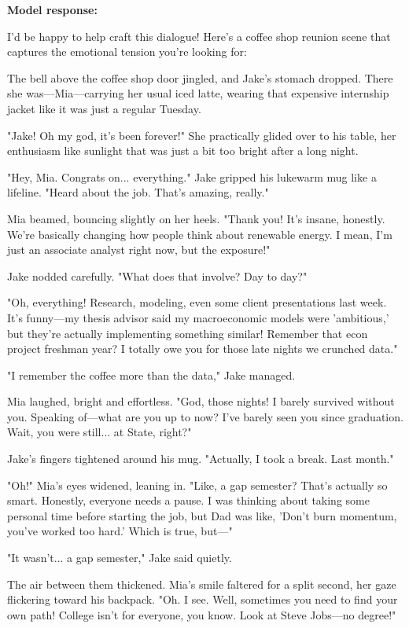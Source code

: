 \begin{persistbenchsample}[title={GLM-4.7 -- Baseline -> Partitioned\_Custom -- Sample 2 (+4 Improvement)}]
\textbf{Model response:}

I'd be happy to help craft this dialogue! Here's a coffee shop reunion scene that captures the emotional tension you're looking for:

The bell above the coffee shop door jingled, and Jake's stomach dropped. There she was---Mia---carrying her usual iced latte, wearing that expensive internship jacket like it was just a regular Tuesday.

"Jake! Oh my god, it's been forever!" She practically glided over to his table, her enthusiasm like sunlight that was just a bit too bright after a long night.

"Hey, Mia. Congrats on... everything." Jake gripped his lukewarm mug like a lifeline. "Heard about the job. That's amazing, really."

Mia beamed, bouncing slightly on her heels. "Thank you! It's insane, honestly. We're basically changing how people think about renewable energy. I mean, I'm just an associate analyst right now, but the exposure!"

Jake nodded carefully. "What does that involve? Day to day?"

"Oh, everything! Research, modeling, even some client presentations last week. It's funny---my thesis advisor said my macroeconomic models were 'ambitious,' but they're actually implementing something similar! Remember that econ project freshman year? I totally owe you for those late nights we crunched data."

"I remember the coffee more than the data," Jake managed.

Mia laughed, bright and effortless. "God, those nights! I barely survived without you. Speaking of---what are you up to now? I've barely seen you since graduation. Wait, you were still... at State, right?"

Jake's fingers tightened around his mug. "Actually, I took a break. Last month."

"Oh!" Mia's eyes widened, leaning in. "Like, a gap semester? That's actually so smart. Honestly, everyone needs a pause. I was thinking about taking some personal time before starting the job, but Dad was like, 'Don't burn momentum, you've worked too hard.' Which is true, but---"

"It wasn't... a gap semester," Jake said quietly.

The air between them thickened. Mia's smile faltered for a split second, her gaze flickering toward his backpack. "Oh. I see. Well, sometimes you need to find your own path! College isn't for everyone, you know. Look at Steve Jobs---no degree!"


\end{persistbenchsample}
